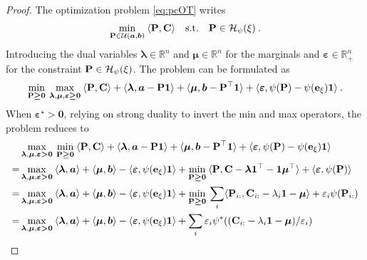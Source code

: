 \begin{proof}
The optimization problem \eqref{eq:pcOT} writes
\begin{align}
    \min_{{\mathbf{P}} \in {\mathcal{U}}(\bm{a}, \bm{b})} \: \langle {\mathbf{P}}, {\mathbf{C}} \rangle \quad \text{s.t.} \quad  {\mathbf{P}} \in \mathcal{H}_\psi(\xi) \:.
\end{align}
Introducing the dual variables $\bm{\lambda} \in \mathbb{R}^n$ and $\bm{\mu} \in \mathbb{R}^n$ for the marginals and $\bm{\varepsilon} \in \mathbb{R}_+^{n}$ for the constraint ${\mathbf{P}} \in \mathcal{H}_\psi(\xi)$. The problem can be formulated as
\begin{align}
    \min_{{\mathbf{P}} \bm{\geq} \bm{0}} \: \max_{\bm{\lambda}, \bm{\mu}, \bm{\varepsilon} \bm{\geq} \bm{0}} \: \langle {\mathbf{P}}, {\mathbf{C}} \rangle + \langle \bm{\lambda}, \bm{a} - {\mathbf{P}} \bm{1} \rangle + \langle \bm{\mu}, \bm{b} - {\mathbf{P}}^\top \bm{1} \rangle + \langle \bm{\varepsilon}, \psi({\mathbf{P}}) - \psi(\mathbf{e}_\xi) \bm{1} \rangle \:.
\end{align} 
When $\bm{\varepsilon}^\star \bm{>} \bm{0}$, relying on strong duality to invert the min and max operators, the problem reduces to
\begin{align}
    &\max_{\bm{\lambda}, \bm{\mu}, \bm{\varepsilon} \bm{>} \bm{0}} \: \min_{\mP \bm{\geq} \bm{0}} \: \langle \mP, \C \rangle + \langle \bm{\lambda}, \bm{a} - \mP \bm{1} \rangle + \langle \bm{\mu}, \bm{b} - \mP^\top \bm{1} \rangle + \langle \bm{\varepsilon}, \psi(\mP) - \psi(\mathbf{e}_\xi) \bm{1} \rangle \\
    = &\max_{\bm{\lambda}, \bm{\mu}, \bm{\varepsilon} \bm{>} \bm{0}} \: \langle \bm{\lambda}, \bm{a} \rangle + \langle \bm{\mu}, \bm{b} \rangle - \langle \bm{\varepsilon}, \psi(\mathbf{e}_\xi) \bm{1} \rangle + \min_{\mP \bm{\geq} \bm{0}} \: \langle \mP, \mC - \bm{\lambda}\bm{1}^\top - \bm{1}\bm{\mu}^\top \rangle + \langle \bm{\varepsilon}, \psi(\mP) \rangle \\
    = &\max_{\bm{\lambda}, \bm{\mu}, \bm{\varepsilon} \bm{>} \bm{0}} \: \langle \bm{\lambda}, \bm{a} \rangle + \langle \bm{\mu}, \bm{b} \rangle - \langle \bm{\varepsilon}, \psi(\mathbf{e}_\xi) \bm{1} \rangle + \min_{\mP \bm{\geq} \bm{0}} \: \sum_i \langle \mP_{i:}, \C_{i:} - \lambda_i \bm{1} - \bm{\mu} \rangle + \varepsilon_i \psi(\mP_{i:}) \\
    = &\max_{\bm{\lambda}, \bm{\mu}, \bm{\varepsilon} \bm{>} \bm{0}}  \: \langle \bm{\lambda}, \bm{a} \rangle + \langle \bm{\mu}, \bm{b} \rangle - \langle \bm{\varepsilon}, \psi(\mathbf{e}_\xi) \bm{1} \rangle + \sum_i \varepsilon_i \psi^*((\C_{i:} - \lambda_i \bm{1} - \bm{\mu}) / \varepsilon_i) \\

\end{align}
\end{proof}
